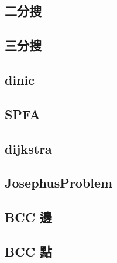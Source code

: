     \subsection{二分搜}
        
    \subsection{三分搜}
         \columnbreak
    \subsection{dinic}
         \columnbreak
    \subsection{SPFA}
        
    \subsection{dijkstra}
        
    \subsection{JosephusProblem}
        
    \subsection{BCC 邊}
        
    \subsection{BCC 點}
        

